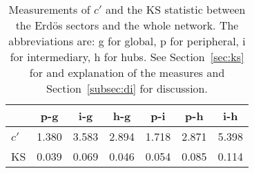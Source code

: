 \begin{table}[h!]
\begin{center}
\begin{tabular}{| l | c | c | c | c | c | c |}\hline
 & p-g & i-g & h-g & p-i & p-h & i-h \\\hline
$c'$ & 1.380  & 3.583  & 2.894  & 1.718  & 2.871  & 5.398 \\\hline
KS & 0.039  & 0.069  & 0.046  & 0.054  & 0.085  & 0.114 \\\hline
\end{tabular}
\caption{Measurements of $c'$ and the KS statistic between the Erd\"os sectors and the whole network. The abbreviations are: g for global, p for peripheral, i for intermediary, h for hubs. See Section~\ref{sec:ks} for and explanation of the measures and Section~\ref{subsec:di} for discussion.}
\end{center}
\end{table}